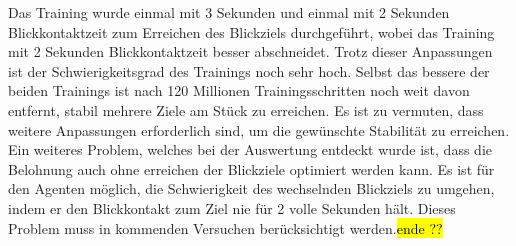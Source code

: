 Das Training wurde einmal mit 3 Sekunden und einmal mit 2 Sekunden Blickkontaktzeit zum Erreichen des Blickziels durchgeführt, wobei das Training mit 2 Sekunden Blickkontaktzeit besser abschneidet. Trotz dieser Anpassungen ist der Schwierigkeitsgrad des Trainings noch sehr hoch. Selbst das bessere der beiden Trainings ist nach 120 Millionen Trainingsschritten noch weit davon entfernt, stabil mehrere Ziele am Stück zu erreichen. Es ist zu vermuten, dass weitere Anpassungen erforderlich sind, um die gewünschte Stabilität zu erreichen. Ein weiteres Problem, welches bei der Auswertung entdeckt wurde ist, dass die Belohnung auch ohne erreichen der Blickziele optimiert werden kann. Es ist für den Agenten möglich, die Schwierigkeit des wechselnden Blickziels zu umgehen, indem er den Blickkontakt zum Ziel nie für 2 volle Sekunden hält. Dieses Problem muss in kommenden Versuchen berücksichtigt werden.\hl{ende ??}

